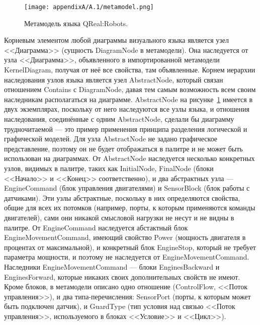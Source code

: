 \begin{figure} [ht]
	\begin{center}
		\texttt{[image: appendixA/A.1/metamodel.png]}
		\caption{Метамодель языка QReal:Robots.}
		\label{image:metamodel}
	\end{center}
\end{figure}

Корневым элементом любой диаграммы визуального языка является узел <<Диаграмма>> 
(сущность DiagramNode в метамодели). Она наследуется от узла <<Диаграмма>>, объявленного 
в импортированной метамодели KernelDiagram, получая от неё все свойства, там объявленные. 
Корнем иерархии наследования узлов языка является узел AbstractNode, который связан 
отношением Contains с DiagramNode, давая тем самым возможность всем своим наследникам 
располагаться на диаграмме. AbstractNode на рисунке~\ref{image:metamodel} имеется 
в двух экземплярах, поскольку от него наследуются все узлы языка, и отношения наследования, 
соединённые с одним AbstractNode, сделали бы диаграмму трудночитаемой --- это пример 
применения принципа разделения логической и графической моделей. Для узла AbstractNode 
не задано графическое представление, поэтому он не будет отображаться в палитре и 
не может быть использован на диаграммах. От AbstractNode наследуется несколько конкретных 
узлов, видимых в палитре, таких как InitialNode, FinalNode (блоки <<Начало>> и <<Конец>> 
соответственно), и два абстрактных узла --- EngineCommand (блок управления двигателями) 
и SensorBlock (блок работы с датчиками). Эти узлы абстрактные, поскольку в них определяются 
свойства, общие для всех их потомков (например, порты, к которым применяются команды 
двигателей), сами они никакой смысловой нагрузки не несут и не видны в палитре. От 
EngineCommand наследуется абстактный блок EngineMovementCommand, имеющий свойство 
Power (мощность двигателя в процентах от максимальной), и конкретный блок EngineStop, 
который не требует параметра мощности, и поэтому не наследуется от EngineMovementCommand. 
Наследники EngineMovementCommand --- блоки EnginesBackward и EnginesForward, которые 
никаких своих дополнительных свойств не имеют. Кроме блоков, в метамодели описано 
одно отношение (ControlFlow, <<Поток управления>>), и два типа-перечисления: SensorPort 
(порты, к которым может быть подключен датчик), и GuardType (тип условия над связью 
<<Поток управления>>, используемого в блоках <<Условие>> и <<Цикл>>).

